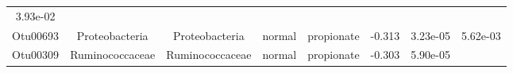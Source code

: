 \documentclass[11pt,]{article}
\begin{document}
\begin{longtable}[]{@{}cccccccc@{}}
\begin{minipage}[t]{0.08\columnwidth}
3.93e-02\strut
\end{minipage}\tabularnewline
\begin{minipage}[t]{0.08\columnwidth}\centering\strut
Otu00693\strut
\end{minipage} & \begin{minipage}[t]{0.15\columnwidth}\centering\strut
Proteobacteria\strut
\end{minipage} & \begin{minipage}[t]{0.15\columnwidth}\centering\strut
Proteobacteria\strut
\end{minipage} & \begin{minipage}[t]{0.08\columnwidth}\centering\strut
normal\strut
\end{minipage} & \begin{minipage}[t]{0.09\columnwidth}\centering\strut
propionate\strut
\end{minipage} & \begin{minipage}[t]{0.07\columnwidth}\centering\strut
-0.313\strut
\end{minipage} & \begin{minipage}[t]{0.08\columnwidth}\centering\strut
3.23e-05\strut
\end{minipage} & \begin{minipage}[t]{0.08\columnwidth}\centering\strut
5.62e-03\strut
\end{minipage}\tabularnewline
\begin{minipage}[t]{0.08\columnwidth}\centering\strut
Otu00309\strut
\end{minipage} & \begin{minipage}[t]{0.15\columnwidth}\centering\strut
Ruminococcaceae\strut
\end{minipage} & \begin{minipage}[t]{0.15\columnwidth}\centering\strut
Ruminococcaceae\strut
\end{minipage} & \begin{minipage}[t]{0.08\columnwidth}\centering\strut
normal\strut
\end{minipage} & \begin{minipage}[t]{0.09\columnwidth}\centering\strut
propionate\strut
\end{minipage} & \begin{minipage}[t]{0.07\columnwidth}\centering\strut
-0.303\strut
\end{minipage} & \begin{minipage}[t]{0.08\columnwidth}\centering\strut
5.90e-05\strut
\end{minipage} & \begin{minipage}[t]{0.08\columnwidth}\centering\strut

\end{minipage}
\end{longtable}
\end{document}
